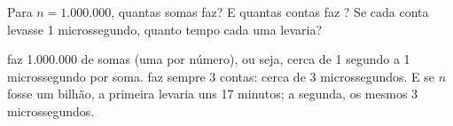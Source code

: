 \begin{exrapido}
Para $n = 1.000.000$, quantas somas  faz? E quantas contas faz
? Se cada conta levasse 1 microssegundo, quanto tempo cada uma
levaria?
\end{exrapido}

\begin{respostas}
    faz 1.000.000 de somas (uma por número), ou seja, cerca de
  1 segundo a 1 microssegundo por soma.  faz sempre 3 contas: cerca de
  3 microssegundos. E se $n$ fosse um bilhão, a primeira levaria uns 17 minutos; a segunda,
  os mesmos 3 microssegundos.
\end{respostas}
